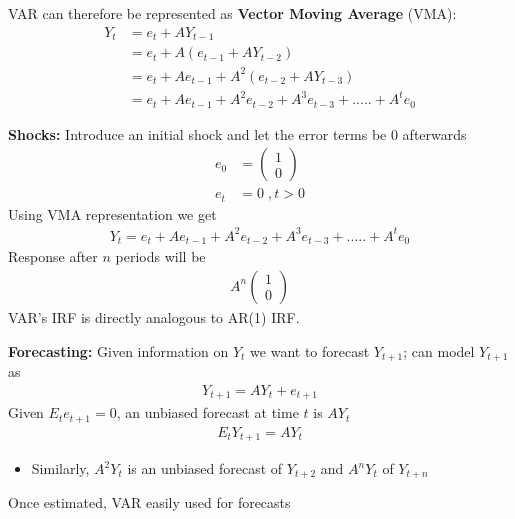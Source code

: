 \documentclass{beamer}
\begin{document}
\begin{frame}
  VAR can therefore be represented as \textbf{Vector Moving Average} (VMA):
  \begin{align}
    Y_t &= e_t + AY_{t-1}\\ \nonumber
        &= e_t + A(e_{t-1} + AY_{t-2})\\ \nonumber
        &= e_t + Ae_{t-1} + A^2(e_{t-2} + AY_{t-3})\\ \nonumber
        &= e_t + Ae_{t-1} + A^2e_{t-2} + A^3e_{t-3} + ..... + A^te_0  
  \end{align}
\end{frame}

\begin{frame}
\textbf{Shocks:} Introduce an initial shock and let the error terms be 0 afterwards
\begin{align}  
  e_0&=\begin{pmatrix}   1 \\ 0   \end{pmatrix} \\ 
  e_t&=0\;,t>0 
\end{align}
\medskip
Using VMA representation we get 
\begin{align} 
Y_t = e_t + Ae_{t-1} + A^2e_{t-2} + A^3e_{t-3} + ..... + A^te_0 
\end{align}
\medskip
 Response after $n$ periods will be 
\begin{align}
  A^n \begin{pmatrix} 1 \\ 0  \end{pmatrix}
\end{align}
\medskip
VAR's IRF is directly analogous to AR(1) IRF.
\end{frame}

\begin{frame}
 \textbf{Forecasting:} Given information on $Y_t$ we want to forecast $Y_{t+1}$;
 can model $Y_{t+1}$ as
 \begin{align}  
  Y_{t+1} = AY_t + e_{t+1} 
  \end{align}
  Given $E_te_{t+1}= 0$, an unbiased forecast at time $t$ is $AY_t$ 
  \begin{align} 
  E_tY_{t+1} = AY_t 
  \end{align}
  \begin{itemize}
    \item Similarly, $A^2Y_t$ is an unbiased forecast of $Y_{t+2}$ and $A^nY_t$ of $Y_{t+n}$
  \end{itemize}
  \medskip
  Once estimated, VAR easily used for forecasts  
\end{frame}
\end{document}

